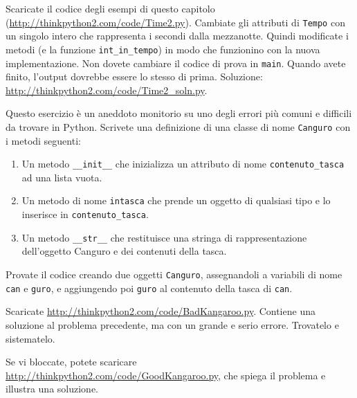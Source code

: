 \documentclass[10pt]{book}
\begin{document}
\vspace{0.2in}
\begin{exercise}

Scaricate il codice degli esempi di questo capitolo
(\url{http://thinkpython2.com/code/Time2.py}).  Cambiate gli attributi di {\tt Tempo} con un singolo intero che rappresenta i secondi dalla mezzanotte. Quindi modificate i metodi (e la funzione \verb"int_in_tempo") in modo che funzionino con la nuova implementazione. Non dovete cambiare il codice di prova in {\tt main}.  Quando avete finito, l'output dovrebbe essere lo stesso di prima. Soluzione: \url{http://thinkpython2.com/code/Time2_soln.py}.
\end{exercise}

\vspace{0.2in}
\begin{exercise}
\label{kangaroo}

Questo esercizio è un aneddoto monitorio su uno degli errori più comuni e difficili da trovare in Python. Scrivete una definizione di una classe di nome {\tt Canguro} con i metodi seguenti:

\begin{enumerate}

\item Un metodo \verb"__init__" che inizializza un attributo di nome
\verb"contenuto_tasca" ad una lista vuota.

\item Un metodo di nome \verb"intasca" che prende un oggetto di qualsiasi tipo e lo inserisce in \verb"contenuto_tasca".

\item Un metodo \verb"__str__" che restituisce una stringa di rappresentazione  dell'oggetto Canguro e dei contenuti della tasca.

\end{enumerate}
%
Provate il codice creando due oggetti {\tt Canguro}, assegnandoli a variabili di nome {\tt can} e {\tt guro}, e aggiungendo poi {\tt guro} al contenuto della tasca di {\tt can}.

Scaricate \url{http://thinkpython2.com/code/BadKangaroo.py}.  Contiene una soluzione al problema precedente, ma con un grande e serio errore. Trovatelo e sistematelo.  

Se vi bloccate, potete scaricare
\url{http://thinkpython2.com/code/GoodKangaroo.py}, che spiega il problema e illustra una soluzione.

\end{exercise}
\end{document}
